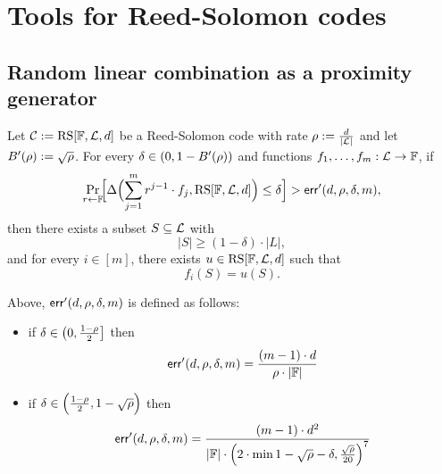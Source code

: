 \chapter{Tools for Reed-Solomon codes}

\section{Random linear combination as a proximity generator}\label{sec:proximity_gap}


\begin{theorem}
    Let $\mathcal{C} := \mathrm{RS}[\mathbb{F},\mathcal{L},d]$ be a Reed-Solomon code with rate $\rho:=\frac{d}{|\mathcal{L}|}$ and let $B'(\rho):=\sqrt{\rho}$. For every $\delta \in (0,1 - B'(\rho))$ and functions $f_1,\ldots,f_m : \mathcal{L} \to \mathbb{F}$, if
    \[
    \Pr_{r\leftarrow\mathbb{F}}\!\Bigl[
      \Delta\Bigl(\sum_{j=1}^m r^{j - 1}\cdot {f_j},\mathrm{RS}[\mathbb{F},\mathcal{L},d]\Bigr)
      \le \delta
    \Bigr]>\mathsf{err}'(d,\rho,\delta,m),
    \]
    then there exists a subset $S \subseteq \mathcal{L}$ with 
    \[
    |S| \ge (1 - \delta)\cdot|L|,
    \]
    and for every $i \in [m]$, there exists $u \in \mathrm{RS}[\mathbb{F},\mathcal{L},d]$ such that
    \[
    f_i(S) = u(S).
    \]
    
    \medskip
    
    \noindent
    Above, $\mathsf{err}'(d,\rho,\delta,m)$ is defined as follows:
    \begin{itemize}
        \item if $\delta \in \left(0,\frac{1-\rho}{2}\right]$ then
            \[
                \mathsf{err}'(d,\rho,\delta,m)=\frac{(m-1)\cdot d}{\rho\cdot|\mathbb{F}|}
            \]
        \item if $\delta \in \Bigl(\frac{1-\rho}{2}, 1-\sqrt{\rho}\Bigr)$ then
        \[
            \mathsf{err}'(d,\rho,\delta,m)=\frac{(m-1)\cdot {d}^2}{|\mathbb{F}|\cdot{\Bigl(2\cdot\min{1-\sqrt{\rho}-\delta,\frac{\sqrt{\rho}}{20}}\Bigr)}^7}
        \]
    \end{itemize}
    \end{theorem}
    
